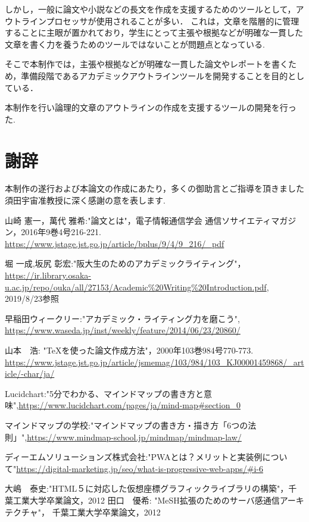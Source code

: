 \documentclass[a4j,12pt]{jarticle}
\begin{document}
しかし，一般に論文や小説などの長文を作成を支援するためのツールとして，アウトラインプロセッサが使用されることが多い．
これは，文章を階層的に管理することに主眼が置かれており，学生にとって主張や根拠などが明確な一貫した文章を書く力を養うためのツールではないことが問題点となっている.

そこで本制作では，主張や根拠などが明確な一貫した論文やレポートを書くため，準備段階であるアカデミックアウトラインツールを開発することを目的としている．

本制作を行い論理的文章のアウトラインの作成を支援するツールの開発を行った.
\newpage
\section*{謝辞}
本制作の遂行および本論文の作成にあたり，多くの御助言とご指導を頂きました須田宇宙准教授に深く感謝の意を表します.


 \begin{thebibliography}{99}
山崎 憲一，萬代 雅希:"論文とは"，電子情報通信学会 通信ソサイエティマガジン，2016年9巻4号216-221.
\url{https://www.jstage.jst.go.jp/article/bplus/9/4/9_216/_pdf}

 堀 一成,坂尻 彰宏:"阪大生のためのアカデミックライティング"，
\url{https://ir.library.osaka-u.ac.jp/repo/ouka/all/27153/Academic%20Writing%20Introduction.pdf}, 2019/8/23参照

早稲田ウィークリー:"アカデミック・ライティング力を磨こう",
\url{https://www.waseda.jp/inst/weekly/feature/2014/06/23/20860/}

 山本　浩: "TeXを使った論文作成方法"，2000年103巻984号770-773.
\url{https://www.jstage.jst.go.jp/article/jsmemag/103/984/103_KJ00001459868/_article/-char/ja/}

 Lucidchart:"5分でわかる、マインドマップの書き方と意味",\url{https://www.lucidchart.com/pages/ja/mind-map#section_0}

 マインドマップの学校:"マインドマップの書き方・描き方「6つの法則」",\url{https://www.mindmap-school.jp/mindmap/mindmap-law/}

 ディーエムソリューションズ株式会社:"PWAとは？メリットと実装例について"\url{https://digital-marketing.jp/seo/what-is-progressive-web-apps/#i-6}

大嶋　泰史:"HTML５に対応した仮想座標グラフィックライブラリの構築"，千葉工業大学卒業論文，2012
田口　優希: "MeSH拡張のためのサーバ感通信アーキテクチャ"， 千葉工業大学卒業論文，2012

\end{thebibliography}
\end{document}
